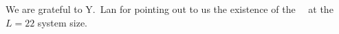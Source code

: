 
We are grateful to Y.~Lan for pointing out to us the existence of
the  ~\eqv\ at the $L=22$ system size.
